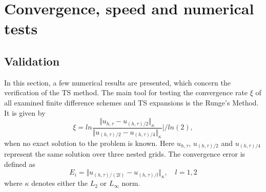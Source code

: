 \documentclass[11pt,a4paper,twoside]{article}
\begin{document}
\section{Convergence, speed and numerical tests}\label{NumTests}
\subsection{Validation}
In this section, a few numerical results are presented, which concern the verification of the TS method. The main tool for testing the convergence rate $\xi$ of all examined finite difference schemes and TS expansions is the Runge's Method. It is given by
\begin{equation}\label{Runge}
\xi = ln  \frac{\Vert u_{h,\tau} - u_{(h,\tau)/2} \Vert_\kappa } {\Vert  u_{(h,\tau)/2} - u_{(h,\tau)/4} \Vert_\kappa  } | / ln(2),
\end{equation}
when no exact solution to the problem is known. Here $u_{h,\tau}$, $u_{(h,\tau)/2}$ and $u_{(h,\tau)/4}$ represent the same solution over three nested grids. The convergence error is defined as
\begin{equation}\label{Norm}
E_i = \Vert u_{(h,\tau)/(2l)} - u_{(h,\tau)/l} \Vert_\kappa, \quad l = 1,2
\end{equation}
where $\kappa$ denotes either the $L_2$ or $L_\infty$  norm.
\end{document}
